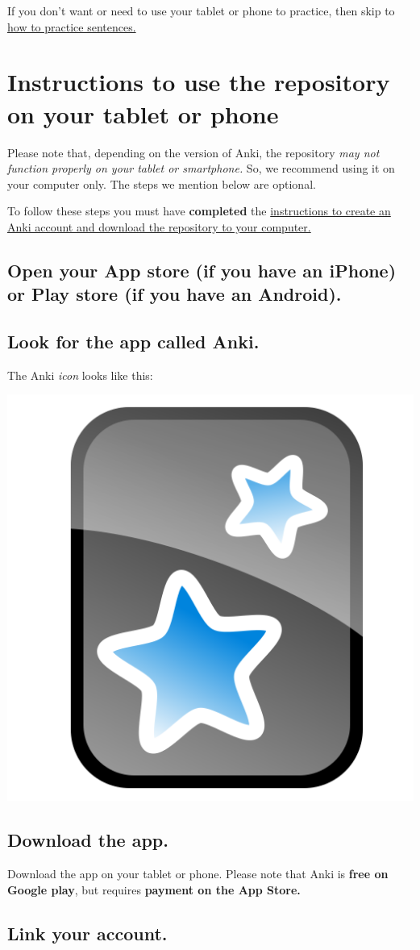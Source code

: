 \documentclass[
]{book}
\begin{document}
If you don't want or need to use your tablet or phone to practice, then skip to \hyperref[cross_5]{how to practice sentences.}

\chapter{Instructions to use the repository on your tablet or phone}\label{instructions-to-use-the-repository-on-your-tablet-or-phone}

Please note that, depending on the version of Anki, the repository \emph{may not function properly on your tablet or smartphone.} So, we recommend using it on your computer only. The steps we mention below are optional.

To follow these steps you must have \textbf{completed} the \hyperref[cross_3]{instructions to create an Anki account and download the repository to your computer.}

\section{Open your App store (if you have an iPhone) or Play store (if you have an Android).}\label{open-your-app-store-if-you-have-an-iphone-or-play-store-if-you-have-an-android.}

\section{Look for the app called Anki.}\label{look-for-the-app-called-anki.}

The Anki \emph{icon} looks like this:

\includegraphics[width=0.1\linewidth]{images/reposit_en/Anki_logo}

\section{Download the app.}\label{download-the-app.}

Download the app on your tablet or phone. Please note that Anki is \textbf{free on Google play}, but requires \textbf{payment on the App Store.}

\section{Link your account.}\label{link-your-account.}
\end{document}
